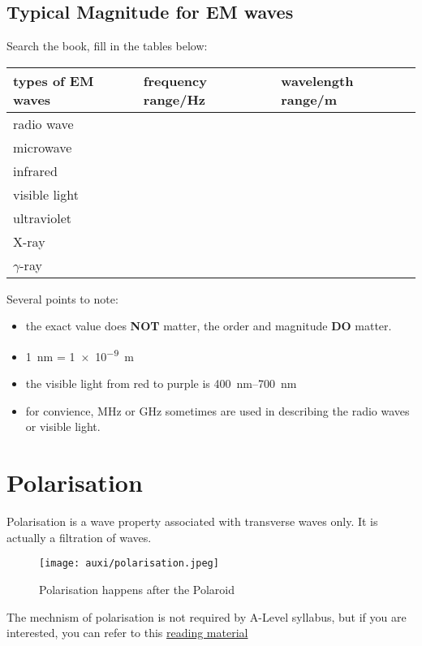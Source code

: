 \documentclass[a4paper]{tufte-handout}
\begin{document}
\subsection{Typical Magnitude for EM waves}
Search the book, fill in the tables below:
\begin{table}[h]
\begin{tabular}{|l|l|l|}
\hline
types of EM waves & frequency range/\si{\hertz} & wavelength range/\si{\m} \\ \hline
radio wave        &                 &                  \\ \hline
microwave         &                 &                  \\ \hline
infrared          &                 &                  \\ \hline
visible light     &                 &                  \\ \hline
ultraviolet       &                 &                  \\ \hline
X-ray             &                 &                  \\ \hline
$\gamma$-ray              &                 &                  \\ \hline
\end{tabular}
\end{table}

Several points to note:
\begin{itemize}
  \item the exact value does \textbf{NOT} matter, the order and  magnitude \textbf{DO} matter.
  \item \SI{1}{\nm} = \SI{1e-9}{\m}
  \item the visible light from red to purple is \SIrange{400}{700}{\nm}
  \item for convience, \si{\mega\hertz} or \si{\giga\hertz} sometimes are used in describing the radio waves or visible light.
\end{itemize}

\section{Polarisation}
Polarisation is a wave property associated with transverse waves only. It is actually a filtration of waves.
\begin{figure}[h]
\centering
\texttt{[image: auxi/polarisation.jpeg]}
\caption{Polarisation happens after the Polaroid}
\label{fig:polarisation}
\end{figure}
The mechnism of polarisation is not required by A-Level syllabus, but if you are interested, you can refer to this \href{https://arago.elte.hu/sites/default/files/DSc-Thesis-2003-GaborHorvath-01.pdf}{reading material}
\end{document}
